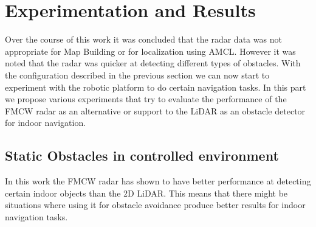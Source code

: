 \chapter{Experimentation and Results}


Over the course of this work it was concluded that the radar data was not appropriate for Map Building or for localization using \ac{AMCL}. However it was noted that the radar was quicker   at detecting different types of obstacles. 
With the configuration described in the previous section we can now start to experiment with the robotic platform to do certain navigation tasks. In this part we propose various experiments that try to evaluate the  performance of the \ac{FMCW} \ac{radar} as an alternative or support to the \ac{LiDAR} as an obstacle detector for indoor navigation.




\section {Static Obstacles in controlled environment}
In this work the \ac{FMCW} radar has shown to have better performance at detecting certain indoor objects than the 2D \ac{LiDAR}. This means that there might be situations where using it for obstacle avoidance produce better results for indoor navigation tasks. \\

